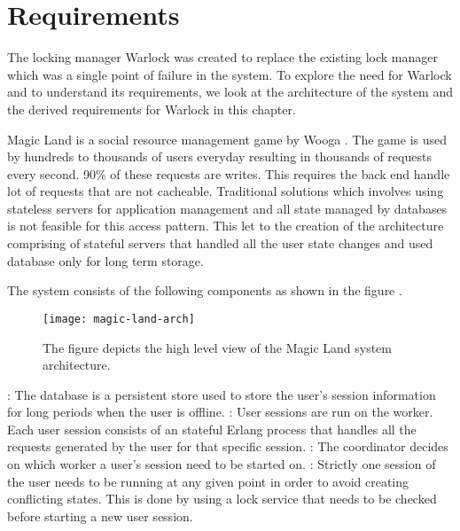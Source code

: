 \chapter{Requirements}
\label{chapter:requirements}

The locking manager Warlock was created to replace the existing lock manager
which was a single point of failure in the system. To explore the need for
Warlock and to understand its requirements, we look at the architecture of
the system and the derived requirements for Warlock in this chapter.

Magic Land \citep{magicland} is a social%
resource management game by Wooga%
. The game is used by hundreds to thousands of users everyday resulting in
thousands of  requests every second. 90\% of these requests are
writes. This requires the back end%
handle lot of requests that are not cacheable. Traditional solutions which
involves using stateless servers for application management and all state
managed
by databases is not feasible for this access pattern. This let to the creation
of the architecture comprising of stateful servers that handled all the user
state changes and used database only for long term storage.

The system consists of the following components as shown in the figure
.

\begin{figure}
  \texttt{[image: magic-land-arch]}
  \caption[Magic Land Architecture]{%
    The figure depicts the high level view of the Magic Land system
    architecture.}
    \label{figure:magic.land.architecture}
  \normalcaption
\end{figure}

\begin{itemize}
    : The database is a persistent store used to store the 
    user's session information for long periods when the user is offline.
    : User sessions are run on the worker. Each user session
    consists of an stateful Erlang process that handles all the requests
    generated by the user for that specific session.
    : The coordinator decides on which worker a user's
    session need to be started on.
    : Strictly one session of the user needs to be
    running at any given point in order to avoid creating conflicting states.
    This is done by using a lock service that needs to be checked before
    starting a new user session.
\end{itemize}

